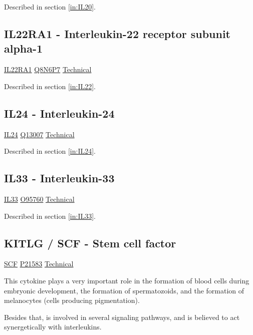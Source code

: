 Described in section \ref{in:IL20}.

\subsection{IL22RA1 - Interleukin-22 receptor subunit alpha-1}

\href{https://en.wikipedia.org/wiki/Interleukin-22_receptor}{IL22RA1}
\href{http://www.uniprot.org/uniprot/Q8N6P7}{Q8N6P7}
\href{https://olink.com/products-services/target/protein/?assayID=5055}{Technical}

Described in section \ref{in:IL22}.

\subsection{IL24 - Interleukin-24}

\href{https://en.wikipedia.org/wiki/Interleukin\_24}{IL24}
\href{http://www.uniprot.org/uniprot/Q13007}{Q13007}
\href{https://olink.com/products-services/target/protein/?assayID=5104}{Technical}

Described in section \ref{in:IL24}.

\subsection{IL33 - Interleukin-33}

\href{https://en.wikipedia.org/wiki/Interleukin_33}{IL33}
\href{http://www.uniprot.org/uniprot/O95760}{O95760}
\href{https://olink.com/products-services/target/protein/?assayID=5118}{Technical}

Described in section \ref{in:IL33}.

\subsection{KITLG / SCF - Stem cell factor}

\href{https://en.wikipedia.org/wiki/Stem_cell_factor}{SCF}
\href{http://www.uniprot.org/uniprot/P21583}{P21583}
\href{https://olink.com/products-services/target/protein/?assayID=5039}{Technical}

This cytokine plays a very important role in the formation of blood cells during embryonic development, the formation of spermatozoids, and the formation of melanocytes (cells producing pigmentation).

Besides that, is involved in several signaling pathways, and is believed to act synergetically with interleukins.

